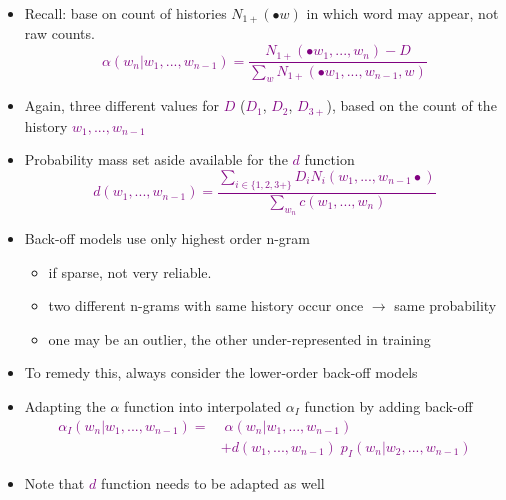 \documentclass[landscape]{slides}
\newcommand{\maths}[1]{\textcolor{purple}{#1}}
\begin{document}

\vspace{15mm}
\begin{itemize}
\item Recall: base on count of histories $N_{1+}(\bullet w)$ in which word may appear, not raw counts.
\maths{\begin{equation*}
\alpha(w_n|w_1,...,w_{n-1}) = \frac{N_{1+}(\bullet w_1,...,w_n)-D}{\sum_{w} N_{1+}(\bullet w_1,...,w_{n-1},w)}
\end{equation*}}
\item Again, three different values for \maths{$D$} (\maths{$D_1$}, \maths{$D_2$}, \maths{$D_{3+}$}), based on the count of the history \maths{$w_1,...,w_{n-1}$}
\end{itemize}


\vspace{35mm}
\begin{itemize}
\item Probability mass set aside available for the \maths{$d$} function
\maths{\begin{equation*}
d(w_1,...,w_{n-1}) = \frac{\sum_{i\in\{1,2,3+\}}  D_i N_i(w_1,...,w_{n-1}\bullet)}{\sum_{w_n} c(w_1,...,w_n)}
\end{equation*}}
\end{itemize}


\begin{itemize}
\item Back-off models use only highest order n-gram
\begin{itemize}
\item if sparse, not very reliable. 
\item two different n-grams with same history occur once $\rightarrow$ same probability
\item one may be an outlier, the other under-represented in training
\end{itemize}
\item To remedy this, always consider the lower-order back-off models
\item Adapting the $\alpha$ function into interpolated $\alpha_I$ function by adding back-off
\maths{\begin{equation*}
\begin{split}
\alpha_I(w_n|w_1,...,w_{n-1}) =  & \; \alpha(w_n|w_1,...,w_{n-1}) \\
& + d(w_1,...,w_{n-1}) \; p_I(w_n|w_2,...,w_{n-1})
\end{split}
\end{equation*}}
\vspace{-17mm}
\item Note that \maths{$d$} function needs to be adapted as well
\end{itemize}
\end{document}
